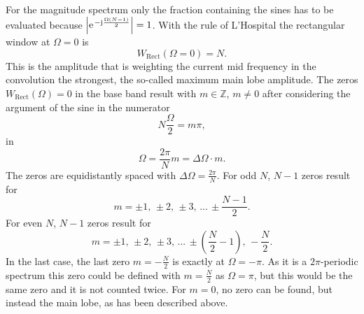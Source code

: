 \documentclass[11pt,a4paper,DIV=12]{scrartcl}
\begin{document}
For the magnitude spectrum only the fraction containing the sines has to be
evaluated because $\left|\e^{-\im\frac{\Omega(N-1)}{2}}\right|=1$.
%
With the rule of L'Hospital \cite[(1.4.15	)]{Nist2010} the rectangular
window at $\Omega=0$ is
%
\begin{equation}
W_\text{Rect}(\Omega=0)=N.
\end{equation}
%
This is the amplitude that is weighting the current mid frequency in the
convolution the strongest, the so-called maximum main lobe amplitude.
%
The zeros $W_\text{Rect}(\Omega)=0$ in the base band result with
$m\in\mathbb{Z}$, $m\neq0$ after considering the argument of the sine in the
numerator
%
\begin{equation}
N\frac{\Omega}{2}=m\pi,
\end{equation}
in
\begin{equation}
\Omega=\frac{2\pi}{N}m=\Delta\Omega\cdot m.
\end{equation}
%
The zeros are equidistantly spaced with $\Delta\Omega=\frac{2\pi}{N}$.
%
For odd $N$, $N-1$ zeros result for
\begin{equation}
m=\pm1,\,\pm2,\,\pm3,\,...\,\pm\frac{N-1}{2}.
\end{equation}
%
For even $N$, $N-1$ zeros result for
\begin{equation}
m=\pm1,\,\pm2,\,\pm3,\,...\,\pm\left(\frac{N}{2}-1\right),\,-\frac{N}{2}.
\end{equation}
%
In the last case, the last zero $m=-\frac{N}{2}$ is exactly at $\Omega=-\pi$.
%
As it is a $2\pi$-periodic spectrum this zero could be defined with
$m=\frac{N}{2}$ as $\Omega=\pi$, but this would be the same zero and it is not
counted twice.
%
For $m=0$, no zero can be found, but instead the main lobe, as has been
described above.
\end{document}
